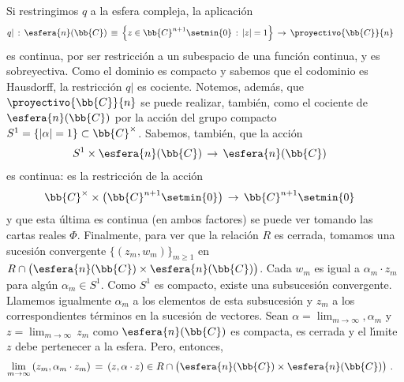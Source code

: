 \begin{ejemplo}
	Si restringimos $q$ a la esfera compleja, la aplicaci\'{o}n
	\begin{align*}
		q| & \,:\,\esfera{n}(\bb{C})\,\equiv\,
			\left\lbrace z\in\bb{C}^{n+1}\setmin\{0\}\,:\,
			|z|=1\right\rbrace\,\rightarrow\,
			\proyectivo{\bb{C}}{n}
	\end{align*}
	es continua, por ser restricci\'{o}n a un subespacio de una
	funci\'{o}n continua, y es sobreyectiva. Como el dominio es
	compacto y sabemos que el codominio es Hausdorff, la restricci\'{o}n
	$q|$ es cociente. Notemos, adem\'{a}s, que $\proyectivo{\bb{C}}{n}$
	se puede realizar, tambi\'{e}n, como el cociente de
	$\esfera{n}(\bb{C})$ por la acci\'{o}n del grupo compacto
	$S^{1}=\{|\alpha|=1\}\subset\bb{C}^{\times}$. Sabemos, tambi\'{e}n,
	que la acci\'{o}n
	\begin{align*}
		S^{1}\times\esfera{n}(\bb{C}) & \,\rightarrow\,
			\esfera{n}(\bb{C})
	\end{align*}
	es continua: es la restricci\'{o}n de la acci\'{o}n
	\begin{align*}
		\bb{C}^{\times}\times\big(\bb{C}^{n+1}\setmin\{0\}\big) &
		\,\rightarrow\,\bb{C}^{n+1}\setmin\{0\}
	\end{align*}
	y que esta \'{u}ltima es continua (en ambos factores) se puede ver
	tomando las cartas reales $\Phi$. Finalmente, para ver que la
	relaci\'{o}n $R$ es cerrada, tomamos una sucesi\'{o}n convergente
	$\{(z_{m},w_{m})\}_{m\geq 1}$ en
	$R\cap\big(\esfera{n}(\bb{C})\times\esfera{n}(\bb{C})\big)$.
	Cada $w_{m}$ es igual a $\alpha_{m}\cdot z_{m}$ para alg\'{u}n
	$\alpha_{m}\in S^{1}$. Como $S^{1}$ es compacto, existe una
	subsucesi\'{o}n convergente. Llamemos igualmente $\alpha_{m}$ a los
	elementos de esta subsucesi\'{o}n y $z_{m}$ a los correspondientes
	t\'{e}rminos en la sucesi\'{o}n de vectores. Sean
	$\alpha=\lim_{m\to\infty},\alpha_{m}$ y $z=\lim_{m\to\infty}\,z_{m}$
	como $\esfera{n}(\bb{C})$ es compacta, es cerrada y el l\'{\i}mite
	$z$ debe pertenecer a la esfera. Pero, entonces,
	\begin{align*}
		\lim_{m\to\infty}\,(z_{m},\alpha_{m}\cdot z_{m}) & \,=\,
		(z,\alpha\cdot z)\in
		R\cap\big(\esfera{n}(\bb{C})\times\esfera{n}(\bb{C})\big)
		\text{ .}
	\end{align*}
\end{ejemplo}

